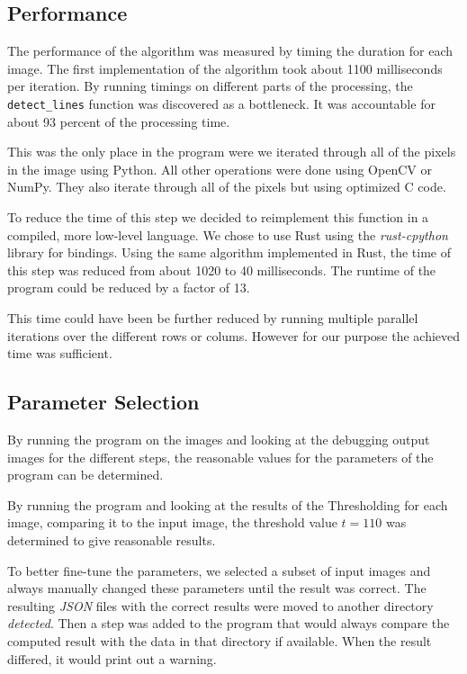 \documentclass[serif,article,noparskip]{agse-thesis}
\begin{document}
\subsection{Performance} \label{performance}

The performance of the algorithm was measured by timing the duration for each
image. The first implementation of the algorithm took about 1100 milliseconds per
iteration. By running timings on different parts of the processing, the
\texttt{detect\_lines} function was discovered as a bottleneck. It was
accountable for about 93 percent of the processing time.

This was the only place in the program were we iterated through all of the pixels
in the image using Python. All other operations were done using OpenCV or NumPy.
They also iterate through all of the pixels but using optimized C code.

To reduce the time of this step we decided to reimplement this function in a
compiled, more low-level language. We chose to use Rust using the \textit{rust-cpython}
library for bindings. Using the same algorithm implemented in Rust, the time of
this step was reduced from about 1020 to 40 milliseconds. The runtime of the
program could be reduced by a factor of 13.

This time could have been be further reduced by running multiple parallel
iterations over the different rows or colums. However for our purpose the
achieved time was sufficient.


\subsection{Parameter Selection} \label{parameter}

By running the program on the images and looking at the debugging output images
for the different steps, the reasonable values for the parameters of the program
can be determined.

By running the program and looking at the results of the Thresholding for each
image, comparing it to the input image, the threshold value $t = 110$ was
determined to give reasonable results.

To better fine-tune the parameters, we selected a subset of input images and
always manually changed these parameters until the result was correct. The
resulting \textit{JSON} files with the correct results were moved to another
directory \textit{detected}. Then a step was added to the program that would
always compare the computed result with the data in that directory if available.
When the result differed, it would print out a warning.
\end{document}

